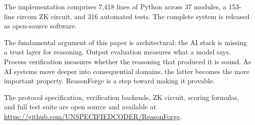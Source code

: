 \documentclass[11pt,a4paper]{article}
\begin{document}
The implementation comprises 7{,}418 lines of Python across 37 modules, a
153-line circom ZK circuit, and 316 automated tests.  The complete system
is released as open-source software.

The fundamental argument of this paper is architectural: the AI stack is
missing a trust layer for reasoning.  Output evaluation measures what a
model says.  Process verification measures whether the reasoning that
produced it is sound.  As AI systems move deeper into consequential
domains, the latter becomes the more important property.  ReasonForge is
a step toward making it provable.

\medskip
\noindent The protocol specification, verification backends, ZK circuit,
scoring formulas, and full test suite are open source and available at
\url{https://github.com/UNSPECIFIEDCODER/ReasonForge}.


\end{document}
